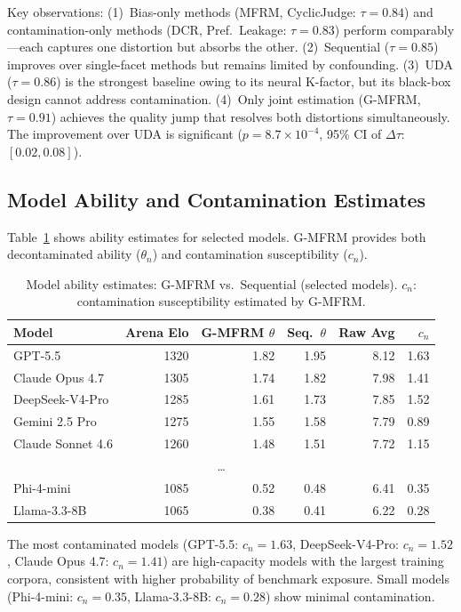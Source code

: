 \documentclass[11pt,a4paper]{article}
\begin{document}
Key observations: (1)~Bias-only methods (MFRM, CyclicJudge: $\tau = 0.84$) and contamination-only methods (DCR, Pref.\ Leakage: $\tau = 0.83$) perform comparably---each captures one distortion but absorbs the other. (2)~Sequential ($\tau = 0.85$) improves over single-facet methods but remains limited by confounding. (3)~UDA ($\tau = 0.86$) is the strongest baseline owing to its neural K-factor, but its black-box design cannot address contamination. (4)~Only joint estimation (G-MFRM, $\tau = 0.91$) achieves the quality jump that resolves both distortions simultaneously. The improvement over UDA is significant ($p = 8.7 \times 10^{-4}$, 95\% CI of $\Delta\tau$: $[0.02, 0.08]$).

\subsection{Model Ability and Contamination Estimates}

Table~\ref{tab:ability} shows ability estimates for selected models. G-MFRM provides both decontaminated ability ($\theta_n$) and contamination susceptibility ($c_n$).

\begin{table}[t]
\centering
\caption{Model ability estimates: G-MFRM vs.\ Sequential (selected models). $c_n$: contamination susceptibility estimated by G-MFRM.}
\label{tab:ability}
\small
\begin{tabular}{lrrrrr}
\toprule
Model & Arena Elo & G-MFRM $\theta$ & Seq.\ $\theta$ & Raw Avg & $c_n$ \\
\midrule
GPT-5.5 & 1320 & 1.82 & 1.95 & 8.12 & 1.63 \\
Claude Opus 4.7 & 1305 & 1.74 & 1.82 & 7.98 & 1.41 \\
DeepSeek-V4-Pro & 1285 & 1.61 & 1.73 & 7.85 & 1.52 \\
Gemini 2.5 Pro & 1275 & 1.55 & 1.58 & 7.79 & 0.89 \\
Claude Sonnet 4.6 & 1260 & 1.48 & 1.51 & 7.72 & 1.15 \\
\multicolumn{6}{c}{\dots} \\
Phi-4-mini & 1085 & 0.52 & 0.48 & 6.41 & 0.35 \\
Llama-3.3-8B & 1065 & 0.38 & 0.41 & 6.22 & 0.28 \\
\bottomrule
\end{tabular}
\end{table}

The most contaminated models (GPT-5.5: $c_n = 1.63$, DeepSeek-V4-Pro: $c_n = 1.52$, Claude Opus 4.7: $c_n = 1.41$) are high-capacity models with the largest training corpora, consistent with higher probability of benchmark exposure. Small models (Phi-4-mini: $c_n = 0.35$, Llama-3.3-8B: $c_n = 0.28$) show minimal contamination.
\end{document}
